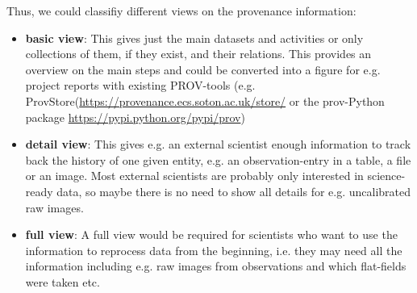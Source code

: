 Thus, we could classifiy different views on the provenance information:
\begin{itemize}
\item \textbf{basic view}: This gives just the main datasets and activities or only collections of them, if they exist, and their relations. This provides an overview on the main steps and could be converted into a figure for e.g. project reports with existing PROV-tools (e.g. ProvStore(\url{https://provenance.ecs.soton.ac.uk/store/} or the prov-Python package \url{https://pypi.python.org/pypi/prov})  

\item \textbf{detail view}: This gives e.g. an external scientist enough information to track back the history of one given entity, e.g. an observation-entry in a table, a file or an image. Most external scientists are probably only interested in science-ready data, so maybe there is no need to show all details for e.g. uncalibrated raw images.

\item \textbf{full view}: A full view would be required for scientists who want to use the information to reprocess data from the beginning, i.e. they may need all the information including e.g. raw images from observations and which flat-fields were taken etc.
\end{itemize}


